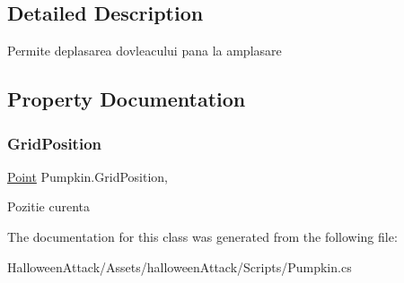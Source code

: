 \subsection{Detailed Description}
Permite deplasarea dovleacului pana la amplasare 

\subsection{Property Documentation}
\mbox{\label{class_pumpkin_aa958881a119da828858daf9e3bc069de}} 
\subsubsection{\texorpdfstring{Grid\+Position}{GridPosition}}
{\footnotesize\ttfamily \hyperlink{struct_point}{Point} Pumpkin.\+Grid\+Position\hspace{0.3cm}{\ttfamily [get]}, {\ttfamily [set]}}

Pozitie curenta 

The documentation for this class was generated from the following file\+:\begin{DoxyCompactItemize}
\item 
Halloween\+Attack/\+Assets/halloween\+Attack/\+Scripts/Pumpkin.\+cs\end{DoxyCompactItemize}
